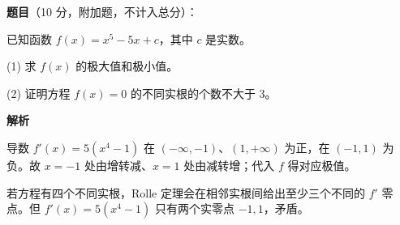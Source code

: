 \begin{answer}

\textbf{题目}（10 分，附加题，不计入总分）：

已知函数 $f(x)=x^5-5x+c$，其中 $c$ 是实数。

(1) 求 $f(x)$ 的极大值和极小值。

(2) 证明方程 $f(x)=0$ 的不同实根的个数不大于 3。

\textbf{解析}


导数 $f'(x)=5(x^4-1)$ 在 $(-\infty,-1)$、$(1,+\infty)$ 为正，在 $(-1,1)$ 为负。故 $x=-1$ 处由增转减、$x=1$ 处由减转增；代入 $f$ 得对应极值。


若方程有四个不同实根，Rolle 定理会在相邻实根间给出至少三个不同的 $f'$ 零点。但 $f'(x)=5(x^4-1)$ 只有两个实零点 $-1,1$，矛盾。



\end{answer}